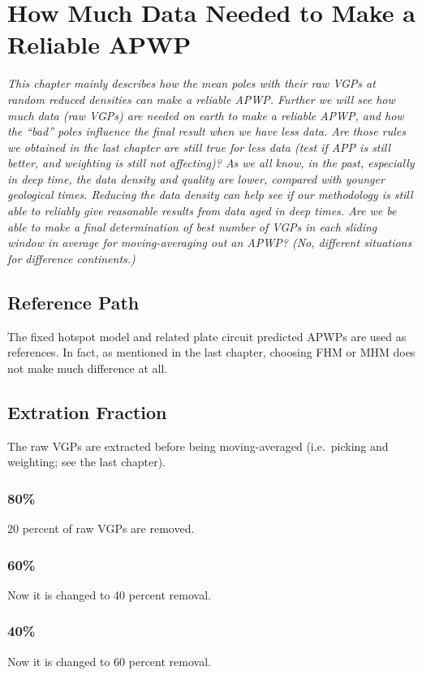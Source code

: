 \chapter{How Much Data Needed to Make a Reliable APWP}\label{chap:DatNeed}
\textit{This chapter mainly describes how the mean poles with their raw VGPs
at random reduced densities can make a reliable APWP\@. Further we will see how
much data (raw VGPs) are needed on earth to make a reliable APWP, and how the
``bad'' poles influence the final result when we have less data. Are those
rules we obtained in the last chapter are still true for less data (test if APP
is still better, and weighting is still not affecting)? As we all know, in the
past, especially in deep time, the data density and quality are lower, compared
with younger geological times. Reducing the data density can help see if our
methodology is still able to reliably give reasonable results from data aged in
deep times. Are we be able to make a final determination of best number of VGPs
in each sliding window in average for moving-averaging out an APWP? (No,
different situations for difference continents.)}
\vfill
\minitoc\newpage

\section{Reference Path}

The fixed hotspot model and related plate circuit predicted APWPs are used as
references. In fact, as mentioned in the last chapter, choosing FHM or MHM does
not make much difference at all.

\section{Extration Fraction}

The raw VGPs are extracted before being moving-averaged (i.e.\ picking and weighting;
see the last chapter).

\subsection{80\%}
20 percent of raw VGPs are removed.

\subsection{60\%}
Now it is changed to 40 percent removal.

\subsection{40\%}
Now it is changed to 60 percent removal.

